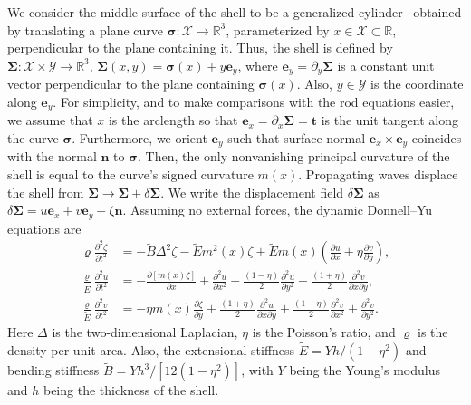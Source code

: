 We consider the middle surface of the shell to be a generalized cylinder~\cite{pressley2010} obtained by translating a plane curve $\bm{\sigma}: \mathcal{X} \to \mathbb{R}^{3}$, parameterized by $x \in \mathcal{X} \subset \mathbb{R}$, perpendicular to the plane containing it.
Thus, the shell is defined by $\bm{\Sigma}: \mathcal{X}\times\mathcal{Y} \to \mathbb{R}^{3}$, $\bm{\Sigma}(x, y) = \bm{\sigma}(x) + y{\bm{e}}_{y}$, where $\bm{e}_{y} = \partial_{y}\bm{\Sigma}$ is a constant unit vector perpendicular to the plane containing $\bm{\sigma}(x)$.
Also, $y \in \mathcal{Y}$ is the coordinate along $\bm{e}_{y}$.
For simplicity, and to make comparisons with the rod equations easier, we assume that $x$ is the arclength so that $\bm{e}_{x} = \partial_{x}\bm{\Sigma} = \bm{t}$ is the unit tangent along the curve $\bm{\sigma}$.
Furthermore, we orient $\bm{e}_{y}$ such that surface normal $\bm{e}_{x}\times\bm{e}_{y}$ coincides with the normal $\bm{n}$ to $\bm{\sigma}$.
Then, the only nonvanishing principal curvature of the shell is equal to the curve's signed curvature $m(x)$.
Propagating waves displace the shell from $\bm{\Sigma} \to \bm{\Sigma} + \delta\bm{\Sigma}$.
We write the displacement field $\delta\bm{\Sigma}$ as $\delta\bm{\Sigma} = u\bm{e}_{x} + v\bm{e}_{y} + \zeta\bm{n}$.
Assuming no external forces, the dynamic Donnell--Yu equations are
%
\begin{subequations}
  \begin{align}
    \varrho \frac{\partial^{2}\zeta}{\partial t^{2}} &= -\widetilde{B}\Delta^{2}\zeta - \widetilde{E}m^{2}(x) \zeta + \widetilde{E}m(x)\left(\frac{\partial u}{\partial x} + \eta\frac{\partial v}{\partial y}\right),\\
    \frac{\varrho}{\widetilde{E}} \frac{\partial^{2}u}{\partial t^{2}} &= -\frac{\partial\left[m(x)\zeta\right]}{\partial x} + \frac{\partial^{2}u}{\partial x^2} + \frac{(1-\eta)}{2}\frac{\partial^{2}u}{\partial y^{2}} + \frac{(1+\eta)}{2}\frac{\partial^{2}v}{\partial x \partial y},\\
    \frac{\varrho}{\widetilde{E}} \frac{\partial^{2}v}{\partial t^{2}}&= -\eta m(x)\frac{\partial \zeta}{\partial y} + \frac{(1+\eta)}{2}\frac{\partial^{2}u}{\partial x \partial y} + \frac{(1-\eta)}{2}\frac{\partial^{2}v}{\partial x^{2}} + \frac{\partial^{2}v}{\partial y^2}.
  \end{align}
\end{subequations}
%
Here $\Delta$ is the two-dimensional Laplacian, $\eta$ is the Poisson's ratio, and $\varrho$ is the density per unit area.
Also, the extensional stiffness $\widetilde{E} = Yh/(1-\eta^{2})$ and bending stiffness $\widetilde{B} = Yh^{3}/\left[12(1-\eta^{2})\right]$, with $Y$ being the Young's modulus and $h$ being the thickness of the shell.
